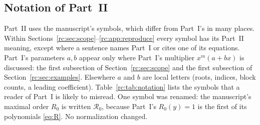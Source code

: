 \documentclass[11pt,a4paper]{article}
\numberwithin{equation}{section}
\theoremstyle{definition}
\theoremstyle{remark}
\newcommand{\Rzero}{\mathcal R_0}
\begin{document}
\subsection{Notation of Part~II}\label{rc:sec:notation}
Part~II uses the manuscript's symbols, which differ from Part~I's in many
places.  Within Sections~\ref{rc:sec:scope}--\ref{rc:app:reproduce} every
symbol has its Part~II meaning, except where a sentence names Part~I or
cites one of its equations.  Part~I's parameters $a,b$ appear only where
Part~I's multiplier $x^m(a+bx)$ is discussed: the first subsection of
Section~\ref{rc:sec:scope} and the first subsection of
Section~\ref{rc:sec:examples}.  Elsewhere $a$ and $b$ are local letters
(roots, indices, block counts, a leading coefficient).
Table~\ref{rc:tab:notation} lists the symbols that a reader of Part~I is
likely to misread.  One symbol was renamed: the manuscript's maximal
order $R_0$ is written $\Rzero$, because Part~I's $R_0(y)=1$ is the first
of its polynomials \eqref{eq:R}.  No normalization changed.
\end{document}
